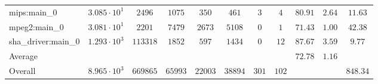 \begin{tabular}{|l|c|c|c|c|c|c|c|c|c|c|}
mips:main\_0            & $ 3.085 \cdot 10^{1} $ & $ 2496   $ & $ 1075  $ & $ 350   $ & $ 461   $ & $ 3   $ & $ 4   $ & $ 80.91       $ & $ 2.64    $ & $ 11.63   $ \\
mpeg2:main\_0           & $ 3.081 \cdot 10^{1} $ & $ 2201   $ & $ 7479  $ & $ 2673  $ & $ 5108  $ & $ 0   $ & $ 1   $ & $ 71.43       $ & $ 1.00    $ & $ 42.38   $ \\
sha\_driver:main\_0     & $ 1.293 \cdot 10^{3} $ & $ 113318 $ & $ 1852  $ & $ 597   $ & $ 1434  $ & $ 0   $ & $ 12  $ & $ 87.67       $ & $ 3.59    $ & $ 9.77    $ \\
\hline
Average                 & $                    $ & $        $ & $       $ & $       $ & $       $ & $     $ & $     $ & $ 72.78       $ & $ 1.16    $ & $         $ \\
\hline
Overall                 & $ 8.965 \cdot 10^{3} $ & $ 669865 $ & $ 65993 $ & $ 22003 $ & $ 38894 $ & $ 301 $ & $ 102 $ & $             $ & $         $ & $ 848.34  $ \\
\hline
\end{tabular}
